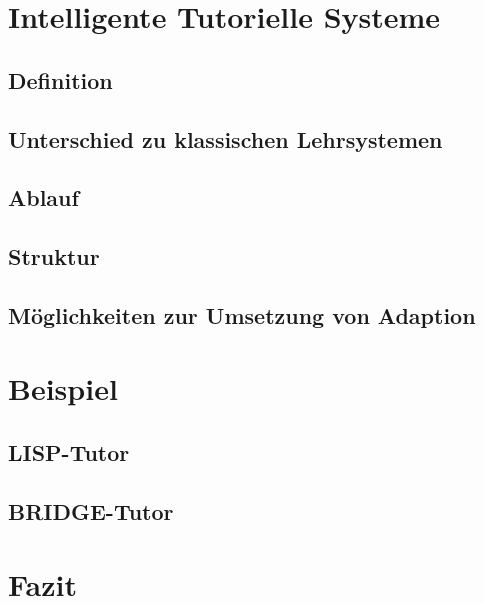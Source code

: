 \documentclass{beamer}
\begin{document}
\section{Intelligente Tutorielle Systeme}
\subsection{Definition}
\subsection{Unterschied zu klassischen Lehrsystemen}
\subsection{Ablauf}
\subsection{Struktur}
\subsection{Möglichkeiten zur Umsetzung von Adaption}


\section{Beispiel}
\subsection{LISP-Tutor}
\subsection{BRIDGE-Tutor}

\section{Fazit}
\end{document}
